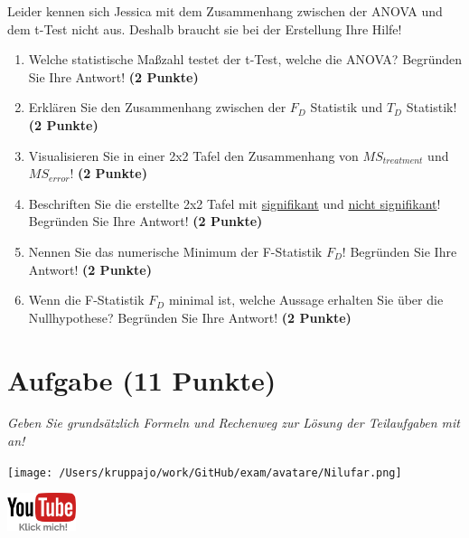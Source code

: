 \documentclass[a4paper, 9pt]{scrartcl}\usepackage[]{graphicx}\usepackage[]{xcolor}
\begin{document}
Leider kennen sich Jessica mit dem Zusammenhang zwischen der ANOVA und dem t-Test nicht aus. Deshalb braucht sie bei der Erstellung Ihre Hilfe! 

\begin{enumerate}
\item Welche statistische Maßzahl testet der t-Test, welche die ANOVA? Begründen Sie Ihre Antwort! \textbf{(2 Punkte)}
\item Erklären Sie den Zusammenhang zwischen der $F_{D}$ Statistik und $T_{D}$ Statistik! \textbf{(2 Punkte)}
\item Visualisieren Sie in einer 2x2 Tafel den Zusammenhang von $MS_{treatment}$ und $MS_{error}$! \textbf{(2 Punkte)}
\item Beschriften Sie die erstellte 2x2 Tafel mit \underline{signifikant} und \underline{nicht signifikant}! Begründen Sie Ihre Antwort! \textbf{(2 Punkte)}
\item Nennen Sie das numerische Minimum der F-Statistik $F_D$! Begründen Sie Ihre Antwort! \textbf{(2 Punkte)}
\item Wenn die F-Statistik $F_D$ minimal ist, welche Aussage erhalten Sie über die Nullhypothese? Begründen Sie Ihre Antwort! \textbf{(2 Punkte)}
\end{enumerate}

 
\clearpage

\section{Aufgabe \hfill (11 Punkte)}

\textit{Geben Sie grundsätzlich Formeln und Rechenweg zur Lösung der Teilaufgaben mit an!} \\[1Ex]
 

 
\ifcollection
\begin{flushright}
\tiny\vspace{-3Ex}
\textbf{\examinhaltstart}
\exammodulebiostat
\vspace{-4Ex}
\end{flushright}
\begin{minipage}[t]{0.5\textwidth}
\texttt{[image: /Users/kruppajo/work/GitHub/exam/avatare/Nilufar.png]}
\end{minipage}
\begin{minipage}[t]{0.5\textwidth}
\hfill
\href{https://youtu.be/M9Uhm67ndxM}{\includegraphics[width = 2cm]{img/youtube}}
\end{minipage}
\vspace{-3Ex}
\fi
\end{document}
